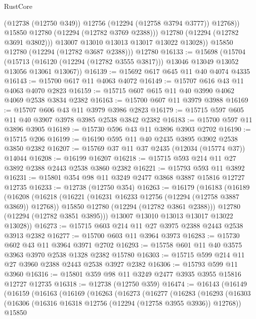 \begin{lexlean}{RustCore}
\begin{coremodule}
                  (@12738 (@12750 @349))
                  @12756
                  (@12294 (@12758 @3794 @3777))
                  @12768))
              @15850
              @12780
              (@12294 (@12782 @3769 @2388)))
            @12780
            (@12294 (@12782 @3691 @3802)))
          @13007
          @13010
          @13013
          @13017
          @13022
          @13028))
      @15850
      @12780
      (@12294 (@12782 @3687 @2388)))
    @12780
@16133 := @15698
    (@15704
      (@15713 (@16120 (@12294 (@12782 @3555 @3817))) @13046 @13049 @13052 @13056 @13061 @13067))
@16139 := @15692 @617 @645 @11 @40 @4074 @4335
@16143 := @15700 @617 @11 @4063 @4072
@16149 := @15707 @616 @43 @11 @4063 @4070 @2823
@16159 := @15715 @607 @615 @11 @40 @3990 @4062 @4069 @2538 @3834 @2382
@16163 := @15700 @607 @11 @3979 @3988
@16169 := @15707 @606 @43 @11 @3979 @3986 @2823
@16179 := @15715 @597 @605 @11 @40 @3907 @3978 @3985 @2538 @3842 @2382
@16183 := @15700 @597 @11 @3896 @3905
@16189 := @15730 @596 @43 @11 @3896 @3903 @2702
@16190 := @15715 @206
@16199 := @16190 @595 @11 @40 @2435 @3895 @3902 @2538 @3850 @2382
@16207 := @15769 @37 @11 @37 @2435 (@12034 (@15774 @37)) @14044
@16208 := @16199 @16207
@16218 := @15715 @593 @214 @11 @27 @3892 @2388 @2443 @2538 @3860 @2382
@16221 := @15793 @593 @11 @3892
@16231 := @15801 @354 @98 @11 @3249 @2477 @3868 @3887 @15816 @12727 @12735
@16233 := @12738 (@12750 @354)
@16263 := @16179
    (@16183
      (@16189
        (@16208
          (@16218
            (@16221 (@16231 @16233 @12756 (@12294 (@12758 @3887 @3869)) @12768))
            @15850
            @12780
            (@12294 (@12782 @3861 @2388)))
          @12780
          (@12294 (@12782 @3851 @3895)))
        @13007
        @13010
        @13013
        @13017
        @13022
        @13028))
@16273 := @15715 @603 @214 @11 @27 @3975 @2388 @2443 @2538 @3913 @2382
@16277 := @15700 @603 @11 @3964 @3973
@16283 := @15730 @602 @43 @11 @3964 @3971 @2702
@16293 := @15758 @601 @11 @40 @3575 @3963 @3970 @2538 @1328 @2382 @15780
@16303 := @15715 @599 @214 @11 @27 @3960 @2388 @2443 @2538 @3927 @2382
@16306 := @15793 @599 @11 @3960
@16316 := @15801 @359 @98 @11 @3249 @2477 @3935 @3955 @15816 @12727 @12735
@16318 := @12738 (@12750 @359)
@16474 := @16143
    (@16149
      (@16159
        (@16163
          (@16169
            (@16263
              (@16273
                (@16277
                  (@16283
                    (@16293
                      (@16303
                        (@16306 (@16316 @16318 @12756 (@12294 (@12758 @3955 @3936)) @12768))
                        @15850

\end{coremodule}
\end{lexlean}
